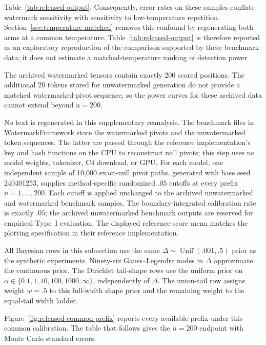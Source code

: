 \documentclass[11pt]{article}
\newcommand{\Unif}{\operatorname{Unif}}
\begin{document}
Table~\ref{tab:released-output}.  Consequently, error rates on these samples conflate watermark sensitivity with sensitivity to low-temperature repetition.  Section~\ref{sec:temperature-matched} removes this confound by regenerating both arms at a common temperature.  Table~\ref{tab:released-output} is therefore reported as an exploratory reproduction of the comparison supported by these benchmark data; it does not estimate a matched-temperature ranking of detection power.

The archived watermarked tensors contain exactly 200 scored positions.  The additional 20 tokens stored for unwatermarked generation do not provide a matched watermarked-pivot sequence, so the power curves for these archived data cannot extend beyond $n=200$.

No text is regenerated in this supplementary reanalysis.  The benchmark files in WatermarkFramework store the watermarked pivots and the unwatermarked token sequences.  The latter are passed through the reference implementation's key and hash functions on the CPU to reconstruct null pivots; this step uses no model weights, tokenizer, C4 download, or GPU.  For each model, one independent sample of 10,000 exact-null pivot paths, generated with base seed 240401253, supplies method-specific randomized $.05$ cutoffs at every prefix $n=1,\ldots,200$.  Each cutoff is applied unchanged to the archived unwatermarked and watermarked benchmark samples.  The boundary-integrated calibration rate is exactly $.05$; the archived unwatermarked benchmark outputs are reserved for empirical Type~I evaluation.  The displayed reference-score menu matches the plotting specification in their reference implementation.

All Bayesian rows in this subsection use the same $\Delta\sim\Unif(.001,.5)$ prior as the synthetic experiments.  Ninety-six Gauss--Legendre nodes in $\Delta$ approximate the continuous prior.  The Dirichlet tail-shape rows use the uniform prior on $\alpha\in\{0.1,1,10,100,1000,\infty\}$, independently of $\Delta$.  The union-tail row assigns weight $w=.5$ to this full-width shape prior and the remaining weight to the equal-tail width ladder.

Figure~\ref{fig:released-common-prefix} reports every available prefix under this common calibration.  The table that follows gives the $n=200$ endpoint with Monte Carlo standard errors.
\end{document}

